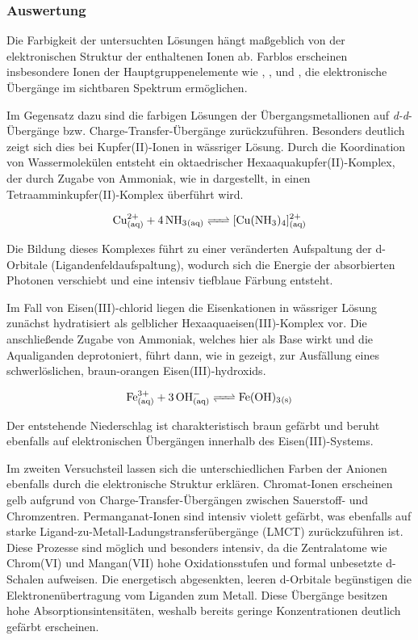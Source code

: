\subsubsection{Auswertung}
Die Farbigkeit der untersuchten Lösungen hängt maßgeblich von der elektronischen Struktur der enthaltenen Ionen ab. Farblos erscheinen insbesondere Ionen der Hauptgruppenelemente wie , ,  und , die elektronische Übergänge im sichtbaren Spektrum ermöglichen.

Im Gegensatz dazu sind die farbigen Lösungen der Übergangsmetallionen auf \textit{d-d}-Übergänge bzw. Charge-Transfer-Übergänge zurückzuführen. Besonders deutlich zeigt sich dies bei Kupfer(II)-Ionen in wässriger Lösung. Durch die Koordination von Wassermolekülen entsteht ein oktaedrischer Hexaaquakupfer(II)-Komplex, der durch Zugabe von Ammoniak, wie in  dargestellt, in einen Tetraamminkupfer(II)-Komplex überführt wird.

\begin{equation}
    \ce{Cu^{2+}_{(aq)} + 4 NH3_{(aq)} <=> [Cu(NH3)4]^{2+}_{(aq)}}
    \label{eq:cu_amminkomplex}
\end{equation}

Die Bildung dieses Komplexes führt zu einer veränderten Aufspaltung der d-Orbitale (Ligandenfeldaufspaltung), wodurch sich die Energie der absorbierten Photonen verschiebt und eine intensiv tiefblaue Färbung entsteht.

Im Fall von Eisen(III)-chlorid liegen die Eisenkationen in wässriger Lösung zunächst hydratisiert als gelblicher Hexaaquaeisen(III)-Komplex vor. Die anschließende Zugabe von Ammoniak, welches hier als Base wirkt und die Aqualiganden deprotoniert, führt dann, wie in  gezeigt, zur Ausfällung eines schwerlöslichen, braun-orangen Eisen(III)-hydroxids.

\begin{equation}
    \ce{Fe^{3+}_{(aq)} + 3 OH^-_{(aq)} <=> Fe(OH)3_{(s)}}
    \label{eq:fe_hydroxidfällung}
\end{equation}

Der entstehende Niederschlag ist charakteristisch braun gefärbt und beruht ebenfalls auf elektronischen Übergängen innerhalb des Eisen(III)-Systems.

Im zweiten Versuchsteil lassen sich die unterschiedlichen Farben der Anionen ebenfalls durch die elektronische Struktur erklären. Chromat-Ionen erscheinen gelb aufgrund von Charge-Transfer-Übergängen zwischen Sauerstoff- und Chromzentren. Permanganat-Ionen sind intensiv violett gefärbt, was ebenfalls auf starke Ligand-zu-Metall-Ladungstransferübergänge (LMCT) zurückzuführen ist. Diese Prozesse sind möglich und besonders intensiv, da die Zentralatome wie Chrom(VI) und Mangan(VII) hohe Oxidationsstufen und formal unbesetzte d-Schalen aufweisen. Die energetisch abgesenkten, leeren d-Orbitale begünstigen die Elektronenübertragung vom Liganden zum Metall. Diese Übergänge besitzen hohe Absorptionsintensitäten, weshalb bereits geringe Konzentrationen deutlich gefärbt erscheinen.

